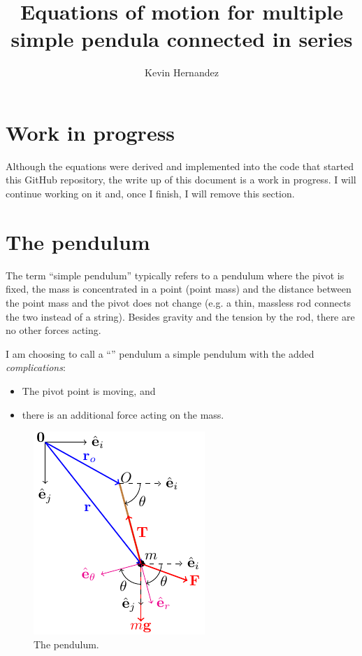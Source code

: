 \documentclass{article}
\title{Equations of motion for multiple simple pendula connected in series}
\author{Kevin Hernandez}
\begin{document}
\maketitle
{}  
\section{Work in progress}
Although the equations were derived and implemented into the code that started this GitHub repository, the write up of this document is a work in progress. I will continue working on it and, once I finish, I will remove this section.

\section{The \ntsp pendulum}
The term ``simple pendulum'' typically refers to a pendulum where the pivot is fixed, the mass is concentrated in a point (point mass) and the distance between the point mass and the pivot does not change (e.g. a thin, massless rod connects the two instead of a string). Besides gravity and the tension by the rod, there are no other forces acting.

I am choosing to call a ``\ntsp'' pendulum a simple pendulum with the added \emph{complications}:
\begin{itemize}
  \item The pivot point is moving, and
  \item there is an additional force acting on the mass.
\end{itemize}

\begin{figure}[ht]
  \centering
  \includegraphics{ntsp}
  \caption{The \ntsp pendulum.}
  \label{f:ntsp}
\end{figure}
\end{document}
